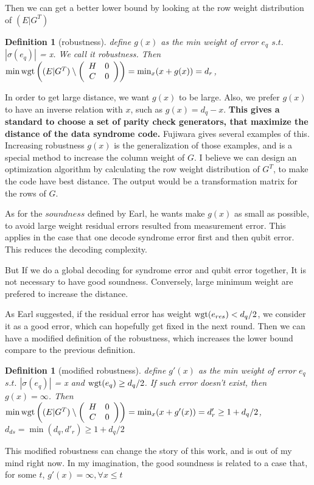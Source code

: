 \documentclass[aps,prb,12pt,tightenlines,%
notitlepage,longbibliography]{revtex4-1}
\newtheorem{definition}[theorem]{Definition}
\begin{document}
Then we can get a better lower bound by looking at the row weight distribution of $(E|G^T)$

\begin{definition}[robustness] 
define $g(x)$ as the min weight of error $e_q$ $s.t.$ $|\sigma (e_q) |$ = x. We call it robustness. Then 
$\min \mathop{\rm wgt} \left( (E|G^T) 
\setminus \left( \begin{array}{cc} H & 0 \\ C & 0 \end{array} \right) \right)
=\min_x (x+g(x))=d_r$, 
\end{definition}
In order to get large distance, we want $g(x)$ to be large. Also, we prefer $g(x)$ to have an inverse relation with $x$, such as $g(x)=d_q-x$.
\textbf{ This gives a standard to choose a set of parity check generators, that maximize the distance of the data syndrome code.} Fujiwara \cite{fujiwara2014ability} gives several examples of this. Increasing robustness $g(x)$ is the generalization of those examples, and is a special method to increase the column weight of $G$. I believe we can design an optimization algorithm by calculating the row weight distribution of $G^T$, to make the code have best distance. The output would be a transformation matrix for the rows of $G$.

As for the $soundness$ defined by Earl, he wants make $g(x)$ as small as possible, to avoid large weight residual errors resulted from measurement error. This applies in the case that one decode syndrome error first and then qubit error. This reduces the decoding complexity.

But If we do a global decoding for syndrome error and qubit error together, It is not necessary to have good soundness. Conversely, large minimum weight are prefered to increase the distance.

As Earl suggested, if the residual error has weight $\mathop{\rm wgt}(e_{res})<d_q/2$, we consider it as a good error, which can hopefully get fixed in the next round. Then we can have a modified definition of the robustness, which increases the lower bound compare to the previous definition.

\begin{definition}[modified robustness] 
define $g'(x)$ as the min weight of error $e_q$ $s.t.$ $|\sigma (e_q) |$ = x and $\mathop{\rm wgt}(e_q) \ge d_q/2$. If such error doesn't exist, then $g(x)=\infty$.
Then 
$\min \mathop{\rm wgt} \left( (E|G^T) 
\setminus \left( \begin{array}{cc} H & 0 \\ C & 0 \end{array} \right) \right)
=\min_x (x+g'(x))=d'_r \ge 1+d_q/2$, $d_{ds}=\min ( d_q,d'_r) \ge 1+d_q/2$
\end{definition}
This modified robustness can change the story of this work, and is out of my mind right now. In my imagination, the good soundness is related to a case that, for some $t$, $g'(x)=\infty, \forall x \le t$
\end{document}

